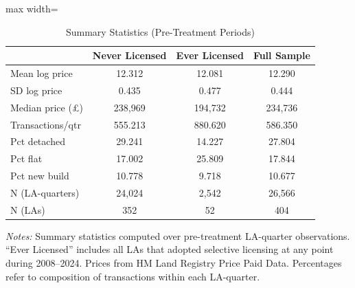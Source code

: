 \begin{table}[t]
\centering
\caption{Summary Statistics (Pre-Treatment Periods)}
\label{tab:sumstats}
\begin{adjustbox}{max width=\textwidth}
\begin{tabular}{lccc}
\toprule
 & Never Licensed & Ever Licensed & Full Sample \\
\midrule
Mean log price & 12.312 & 12.081 & 12.290 \\
SD log price & 0.435 & 0.477 & 0.444 \\
Median price (£) & 238,969 & 194,732 & 234,736 \\
Transactions/qtr & 555.213 & 880.620 & 586.350 \\
Pct detached & 29.241 & 14.227 & 27.804 \\
Pct flat & 17.002 & 25.809 & 17.844 \\
Pct new build & 10.778 & 9.718 & 10.677 \\
N (LA-quarters) & 24,024 & 2,542 & 26,566 \\
N (LAs) & 352 & 52 & 404 \\
\bottomrule
\end{tabular}
\end{adjustbox}
\begin{tablenotes}[flushleft]
\small
\item \textit{Notes:} Summary statistics computed over pre-treatment LA-quarter observations. ``Ever Licensed'' includes all LAs that adopted selective licensing at any point during 2008--2024. Prices from HM Land Registry Price Paid Data. Percentages refer to composition of transactions within each LA-quarter.
\end{tablenotes}
\end{table}
